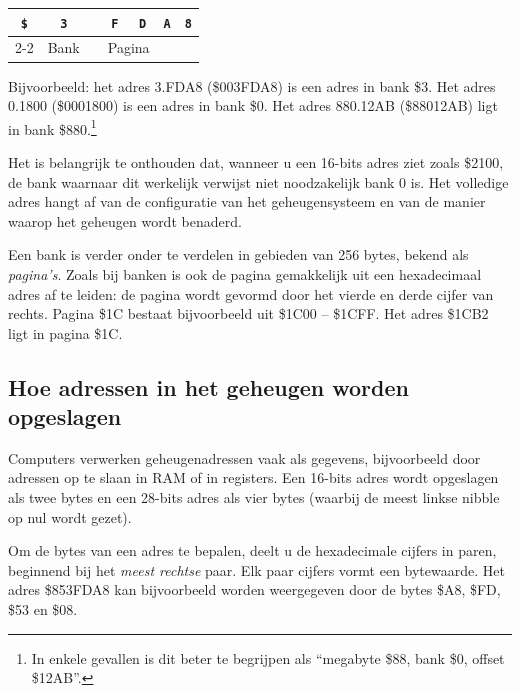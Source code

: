 \medskip
\begin{center}
\begin{tabular}{m{0.4cm}m{0.4cm}m{0.05cm}m{0.4cm}m{0.4cm}m{0.4cm}m{0.4cm}}
\multicolumn{1}{c}{\huge\texttt{\$}} &\multicolumn{1}{c}{\huge\texttt{3}} &\multicolumn{1}{c}{ } &\multicolumn{1}{c}{\huge\texttt{F}} &\multicolumn{1}{c}{\huge\texttt{D}} &\multicolumn{1}{c}{\huge\texttt{A}} &\multicolumn{1}{c}{\huge\texttt{8}} \\
\cline{2-2}\cline{4-5}
& \multicolumn{1}{c}{\small Bank} & & \multicolumn{2}{c}{\small Pagina} &\multicolumn{2}{c}{ } \\
\end{tabular}
\end{center}
\medskip

Bijvoorbeeld: het adres 3.FDA8 (\$003FDA8) is een adres in bank \$3. Het adres 0.1800 (\$0001800) is een adres in bank \$0. Het adres 880.12AB (\$88012AB) ligt in bank \$880.\footnote{In enkele gevallen is dit beter te begrijpen als ``megabyte \$88, bank \$0, offset \$12AB''.}

Het is belangrijk te onthouden dat, wanneer u een 16-bits adres ziet zoals \$2100, de bank waarnaar dit werkelijk verwijst niet noodzakelijk bank 0 is. Het volledige adres hangt af van de configuratie van het geheugensysteem en van de manier waarop het geheugen wordt benaderd.

Een bank is verder onder te verdelen in gebieden van 256 bytes, bekend als {\em pagina's}. Zoals bij banken is ook de pagina gemakkelijk uit een hexadecimaal adres af te leiden: de pagina wordt gevormd door het vierde en derde cijfer van rechts. Pagina \$1C bestaat bijvoorbeeld uit \$1C00 -- \$1CFF. Het adres \$1CB2 ligt in pagina \$1C.

\subsection{Hoe adressen in het geheugen worden opgeslagen}

Computers verwerken geheugenadressen vaak als gegevens, bijvoorbeeld door adressen op te slaan in RAM of in registers. Een 16-bits adres wordt opgeslagen als twee bytes en een 28-bits adres als vier bytes (waarbij de meest linkse nibble op nul wordt gezet).

Om de bytes van een adres te bepalen, deelt u de hexadecimale cijfers in paren, beginnend bij het {\em meest rechtse} paar. Elk paar cijfers vormt een bytewaarde. Het adres \$853FDA8 kan bijvoorbeeld worden weergegeven door de bytes \$A8, \$FD, \$53 en \$08.

